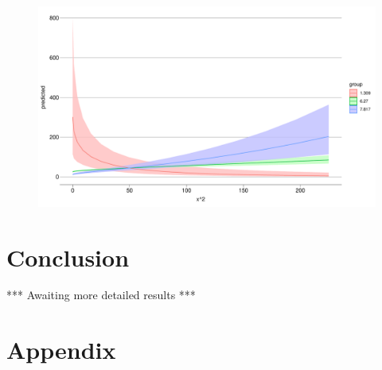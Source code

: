 \documentclass[12pt]{article}
\begin{document}
\begin{figure}[htpb]
	\centering
	\includegraphics[width=\linewidth]{"../R/Output/deathsIntPlot.pdf"}
	\caption{}
	\label{deaths_int}
\end{figure}



\section{Conclusion}

*** Awaiting more detailed results ***


\pagebreak




\pagebreak
\section*{Appendix}


%

\end{document}
